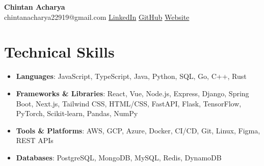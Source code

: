 \documentclass[a4paper,10pt]{article}
\begin{document}
\pagestyle{empty}

\begin{center}
    {\LARGE\bfseries Chintan Acharya}\\[6pt]
    {\small chintanacharya22919@gmail.com \textbar{}  \textbar{} \href{https://www.linkedin.com/in/chintan-acharya-b5757a192/}{LinkedIn} \textbar{} \href{https://github.com/chintan-27}{GitHub} \textbar{} \href{https://thecka.tech/}{Website}}
\end{center}

\vspace{-8pt}

\section*{Technical Skills}
\vspace{-3pt}
\begin{itemize}
   \item \textbf{Languages}: JavaScript, TypeScript, Java, Python, SQL, Go, C++, Rust
\item \textbf{Frameworks \& Libraries}: React, Vue, Node.js, Express, Django, Spring Boot, Next.js, Tailwind CSS, HTML/CSS, FastAPI, Flask, TensorFlow, PyTorch, Scikit-learn, Pandas, NumPy
\item \textbf{Tools \& Platforms}: AWS, GCP, Azure, Docker, CI/CD, Git, Linux, Figma, REST APIs
\item \textbf{Databases}: PostgreSQL, MongoDB, MySQL, Redis, DynamoDB
\end{itemize}

\vspace{-8pt}
\end{document}
